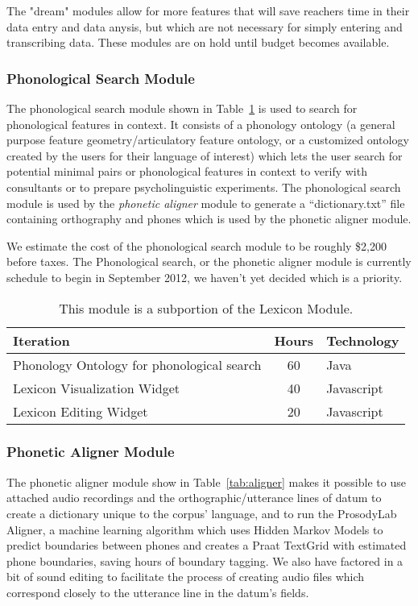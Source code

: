 \documentclass[12 pt]{article}
\begin{document}
The "dream" modules allow for more features that will save reachers time in their data entry and data anysis, but which are not necessary for simply entering and transcribing data. These modules are on hold until budget becomes available. 

\subsubsection{Phonological Search Module}
The phonological search module shown in Table~\ref{tab:phono} is used to search for phonological features in context. It consists of a phonology ontology (a general purpose feature geometry/articulatory feature ontology, or a customized ontology created by the users for their language of interest) which lets the user search for potential minimal pairs or phonological features in context to verify with consultants or to prepare psycholinguistic experiments. The phonological search module is used by the {\it  phonetic aligner} module to generate a ``dictionary.txt'' file containing orthography and phones which is used by the phonetic aligner module.

We estimate the cost of the phonological search module to be roughly \$2,200 before taxes. The Phonological search, or the phonetic aligner module is currently schedule to begin in September 2012, we haven't yet decided which is a priority.

\begin{table}[htbp]
\begin{center}
  \begin{tabular}{ | lcl | }
\hline
Iteration&	Hours&	Technology	\\
\hline
Phonology Ontology for phonological search&	60&	Java	\\ 
Lexicon Visualization Widget&	40&	Javascript	\\ 
Lexicon Editing Widget&	20&	Javascript	\\ 
\hline
  \end{tabular}
 \caption{This module is a subportion of the Lexicon Module.}
  \label{tab:phono}
  \end{center}
\end{table}


\newpage
\subsubsection{Phonetic Aligner Module}
The phonetic aligner module show in Table~\ref{tab:aligner} makes it possible to use attached audio recordings and the orthographic/utterance lines of datum to create a dictionary unique to the corpus' language, and to run the ProsodyLab Aligner, a machine learning algorithm which uses Hidden Markov Models to predict boundaries between phones and creates a Praat TextGrid with estimated phone boundaries, saving hours of boundary tagging. We also have factored in a bit of sound editing to facilitate the process of creating audio files which correspond closely to the utterance line in the datum's fields. 
\end{document}
